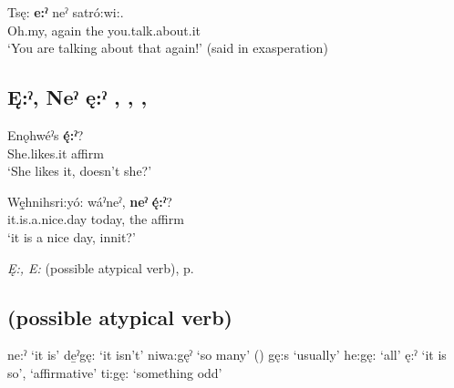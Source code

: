\ea
\label{ex:epart5}
\gll Tsę: \textbf{e:ˀ} neˀ satró:wi:.\\
Oh.my, again the you.talk.about.it\\
\glt ‘You are talking about that again!’ (said in exasperation)
\z


\subsection*{\textbf{Ę:ˀ, Neˀ ę:ˀ} , , , } \label{p:[ę:ˀ], [neˀ ę:ˀ] `isn’t it so?’}

\ea
\label{ex:enpart2}
\gll Enǫhwéˀs \textbf{ę́:ˀ}?\\
She.likes.it affirm\\
\glt ‘She likes it, doesn’t she?’
\z

\ea
\label{ex:enpart3}
\gll Wę̱hnihsri:yó: wáˀneˀ, \textbf{neˀ} \textbf{ę́:ˀ}?\\
it.is.a.nice.day today, the affirm\\
\glt ‘it is a nice day, innit?’
\z

\begin{CayugaRelated}
\item \textit{Ę:, E:} (possible atypical verb), p. \pageref{p:[ę:, e:] `atypical verb’}
\end{CayugaRelated}

\subsection*{ (possible atypical verb)} \label{p:[ę:, e:] `atypical verb’}

\ea
\label{ex:enpart1}
\ea
 ne:ˀ `it is’
\ex de̱ˀgę: `it isn’t’
\ex niwa:gęˀ `so many’ (\cite{henry_de_2005})
\ex gę:s `usually’
\ex he:gę: `all’
\ex ę:ˀ `it is so’, `affirmative’
\ex ti:gę: `something odd’
\z
\z

